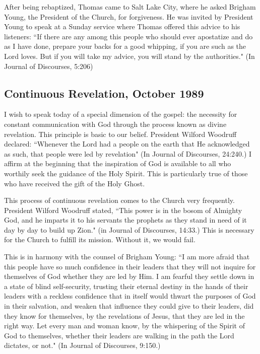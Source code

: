 After being rebaptized, Thomas came to Salt Lake City, where he asked Brigham Young, the President of the Church, for forgiveness. He was invited by President Young to speak at a Sunday service where Thomas offered this advice to his listeners: ``If there are any among this people who should ever apostatize and do as I have done, prepare your backs for a good whipping, if you are such as the Lord loves. But if you will take my advice, you will stand by the authorities." (In Journal of Discourses, 5:206)

\subsection{Continuous Revelation, October 1989}

I wish to speak today of a special dimension of the gospel: the necessity for constant communication with God through the process known as divine revelation. This principle is basic to our belief. President Wilford Woodruff declared: ``Whenever the Lord had a people on the earth that He acknowledged as such, that people were led by revelation" (In Journal of Discourses, 24:240.) I affirm at the beginning that the inspiration of God is available to all who worthily seek the guidance of the Holy Spirit. This is particularly true of those who have received the gift of the Holy Ghost.

This process of continuous revelation comes to the Church very frequently. President Wilford Woodruff stated, ``This power is in the bosom of Almighty God, and he imparts it to his servants the prophets as they stand in need of it day by day to build up Zion." (in Journal of Discourses, 14:33.) This is necessary for the Church to fulfill its mission. Without it, we would fail.

This is in harmony with the counsel of Brigham Young: ``I am more afraid that this people have so much confidence in their leaders that they will not inquire for themselves of God whether they are led by Him. I am fearful they settle down in a state of blind self-security, trusting their eternal destiny in the hands of their leaders with a reckless confidence that in itself would thwart the purposes of God in their salvation, and weaken that influence they could give to their leaders, did they know for themselves, by the revelations of Jesus, that they are led in the right way. Let every man and woman know, by the whispering of the Spirit of God to themselves, whether their leaders are walking in the path the Lord dictates, or not." (In Journal of Discourses, 9:150.)

